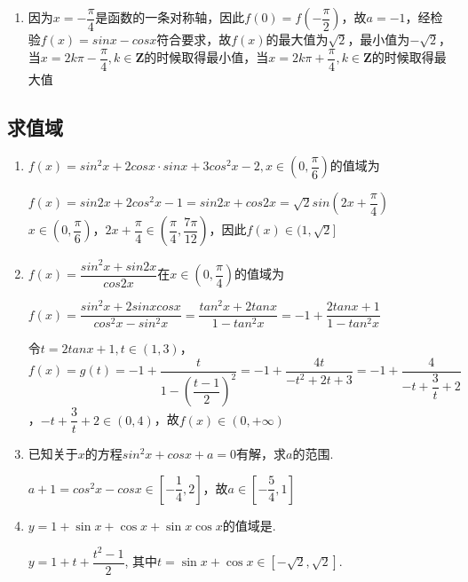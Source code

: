 \begin{enumerate}
\begin{jieda}
\begin{enumerate}
            \item 因为$x = -\dfrac{\pi}{4}$是函数的一条对称轴，因此$f(0) = f(-\dfrac{\pi}{2})$，故$a = -1$，经检验$f(x) = sinx - cosx$符合要求，故$f(x)$的最大值为$\sqrt{2}$，最小值为$-\sqrt{2}$，当$x = 2k\pi - \dfrac{\pi}{4}, k \in \mathbf{Z}$的时候取得最小值，当$x = 2k\pi + \dfrac{\pi}{4}, k \in \mathbf{Z}$的时候取得最大值
        \end{enumerate}
    \end{jieda}
\end{enumerate}
\subsection*{求值域}
\begin{enumerate}
    \item $f(x) = sin^2x + 2cosx \cdot sinx + 3cos^2x - 2, x \in \left(0, \dfrac{\pi}{6}\right)$的值域为\blkda{$(1, \sqrt{2}]$} 
    \begin{jieda}
        $f(x) = sin2x + 2cos^2x -1 = sin2x + cos2x = \sqrt{2}sin\left(2x+\dfrac{\pi}{4}\right)$ \\
        $x \in \left(0, \dfrac{\pi}{6}\right)$，$2x+\dfrac{\pi}{4} \in \left(\dfrac{\pi}{4}, \dfrac{7\pi}{12}\right)$，因此$f(x) \in (1, \sqrt{2}]$
    \end{jieda}
    \item $f(x) = \dfrac{sin^2x + sin2x}{cos2x}$在$x \in \left(0, \dfrac{\pi}{4}\right)$的值域为
    \begin{jieda}
        $f(x) = \dfrac{sin^2x + 2sinxcosx}{cos^2x-sin^2x} = \dfrac{tan^2x+2tanx}{1-tan^2x} = -1 + \dfrac{2tanx + 1}{1-tan^2x}$

        令$t = 2tanx+1, t \in (1,3)$，$f(x) = g(t) = -1 + \dfrac{t}{1-\left(\dfrac{t-1}{2}\right)^2} = -1 + \dfrac{4t}{-t^2 + 2t +3} = -1 + \dfrac{4}{-t+\dfrac{3}{t}+2}$，$-t + \dfrac{3}{t} + 2 \in \left(0, 4\right)$，故$f(x) \in \left(0, +\infty\right)$
    \end{jieda} 
    \item 已知关于$x$的方程$sin^2x+cosx+a = 0$有解，求$a$的范围.
    \begin{jieda}
        $a+1 = cos^2x - cosx \in \left[-\dfrac{1}{4}, 2\right]$，故$a \in \left[-\dfrac{5}{4}, 1\right]$
    \end{jieda}
    \item $y=1+\sin{x}+\cos{x}+\sin{x}\cos{x}$的值域是. 
    \begin{jieda}
    $y=1+t+\dfrac{t^2-1}{2}$, 其中$t=\sin{x}+\cos{x}\in[-\sqrt{2},\sqrt{2}]$. 
    \end{jieda}


\end{enumerate}
